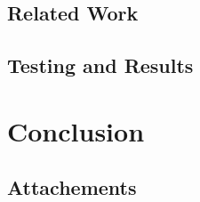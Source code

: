 \documentclass[11pt,oneside]{fithesis2}
\begin{document}
\section{Related Work}\label{related_work}

\section{Testing and Results}

\chapter{Conclusion}

 


\begin{appendix}
	\chapter{Attachements}

\end{appendix}
\end{document}
